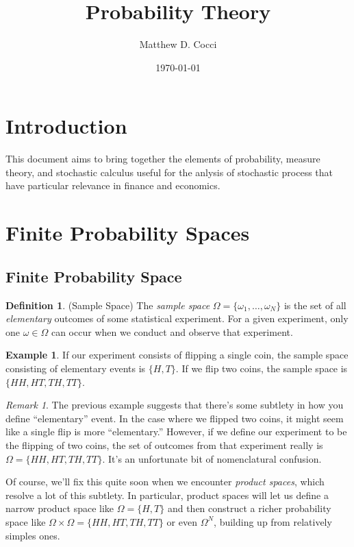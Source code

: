 \documentclass[12pt]{article}
\author{Matthew D. Cocci}
\title{Probability Theory}
\date{\today}
\theoremstyle{plain}
\theoremstyle{definition}
\newtheorem{defn}[thm]{Definition}
\newtheorem{ex}[thm]{Example}
\theoremstyle{remark}
\newtheorem*{rmk}{Remark}
\begin{document}
\maketitle
\tableofcontents

\clearpage

\section{Introduction}

This document aims to bring together the elements of probability,
measure theory, and stochastic calculus useful for the anlysis of
stochastic process that have particular relevance in finance and
economics.

\section{Finite Probability Spaces}

\subsection{Finite Probability Space}

\begin{defn}{(Sample Space)}
The \emph{sample space} $\Omega=\{\omega_1,\ldots,\omega_N\}$ is the set
of all \emph{elementary} outcomes of some statistical experiment. For a
given experiment, only one $\omega \in \Omega$ can occur when we conduct
and observe that experiment.
\end{defn}
\begin{ex}
If our experiment consists of flipping a single coin, the sample space
consisting of elementary events is $\{H,T\}$. If we flip two coins, the
sample space is $\{HH,HT,TH,TT\}$.
\end{ex}
\begin{rmk}
The previous example suggests that there's some subtlety in how you
define ``elementary'' event. In the case where we flipped two coins, it
might seem like a single flip is more ``elementary.'' However, if we define
our experiment to be the flipping of two coins, the set of outcomes from
that experiment really is $\Omega=\{HH,HT,TH,TT\}$. It's an unfortunate
bit of nomenclatural confusion.

Of course, we'll fix this quite soon when we encounter \emph{product
spaces}, which resolve a lot of this subtlety. In particular, product
spaces will let us define a narrow product space like $\Omega=\{H,T\}$
and then construct a richer probability space like
$\Omega\times \Omega = \{HH,HT,TH,TT\}$ or even $\Omega^N$, building up
from relatively simples ones.
\end{rmk}
\end{document}
